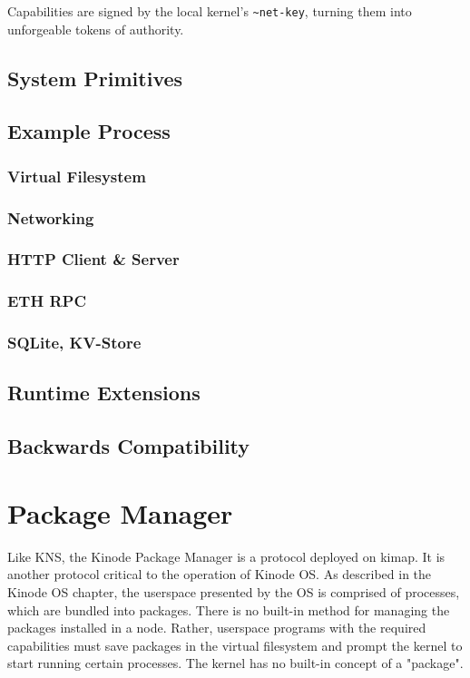 \documentclass[runningheads]{llncs}
\begin{document}
Capabilities are signed by the local kernel's \verb|~net-key|, turning them into unforgeable tokens of authority.

\subsection{System Primitives}
\subsection{Example Process}
\subsubsection{Virtual Filesystem}
\subsubsection{Networking}
\subsubsection{HTTP Client \& Server}
\subsubsection{ETH RPC}
\subsubsection{SQLite, KV-Store}
\subsection{Runtime Extensions}
\subsection{Backwards Compatibility}
%
%
%
\section{Package Manager}

Like KNS, the Kinode Package Manager is a protocol deployed on kimap.
It is another protocol critical to the operation of Kinode OS.
As described in the Kinode OS chapter, the userspace presented by the OS is comprised of processes, which are bundled into packages.
There is no built-in method for managing the packages installed in a node.
Rather, userspace programs with the required capabilities must save packages in the virtual filesystem and prompt the kernel to start running certain processes.
The kernel has no built-in concept of a "package".
\end{document}
